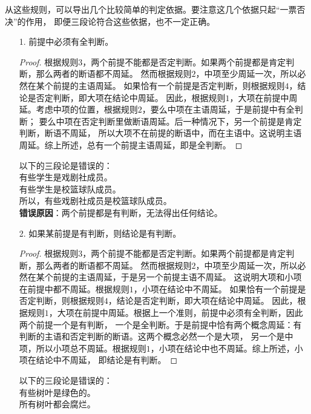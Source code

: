 \documentclass[12pt,UTF8]{ctexbook}
\begin{document}
从这些规则，可以导出几个比较简单的判定依据。要注意这几个依据只起“一票否决”的作用，
即便三段论符合这些依据，也不一定正确。
\begin{enumerate}
    \item[1.] 前提中必须有全判断。
    \begin{proof}
        根据规则$3$，两个前提不能都是否定判断。如果两个前提都是肯定判断，那么两者的断语都不周延。
        然而根据规则$2$，中项至少周延一次，所以必然在某个前提的主语周延。
        如果恰有一个前提是否定判断，则根据规则$4$，结论是否定判断，即大项在结论中周延。
        因此，根据规则$1$，大项在前提中周延。考虑中项的位置，根据规则$2$，要么中项在主语周延，于是前提中有全判断；
        要么中项在否定判断里做断语周延。后一种情况下，另一个前提是肯定判断，断语不周延，
        所以大项不在前提的断语中，而在主语中。这说明主语周延。综上所述，总有一个前提主语周延，即是全判断。
    \end{proof}
    \begin{ex*}
        以下的三段论是错误的： \\
        \indent 有些学生是戏剧社成员。\\
        \indent 有些学生是校篮球队成员。\\
        \indent 所以，有些戏剧社成员是校篮球队成员。\\
        \textbf{错误原因}：两个前提都是有判断，无法得出任何结论。
    \end{ex*}
    \item[2.] 如果某前提是有判断，则结论是有判断。
    \begin{proof}
        根据规则$3$，两个前提不能都是否定判断。如果两个前提都是肯定判断，那么两者的断语都不周延。
        然而根据规则$2$，中项至少周延一次，所以必然在某个前提的主语周延，于是另一个前提主语不周延。
        这说明大项和小项在前提中都不周延。根据规则$1$，小项在结论中不周延。
        如果恰有一个前提是否定判断，则根据规则$4$，结论是否定判断，即大项在结论中周延。
        因此，根据规则$1$，大项在前提中周延。根据上一个准则，前提中必须有全判断，因此两个前提一个是有判断，
        一个是全判断。于是前提中恰有两个概念周延：有判断的主语和否定判断的断语。这两个概念必然一个是大项，
        另一个是中项，所以小项总不周延。根据规则$1$，小项在结论中也不周延。综上所述，小项在结论中不周延，
        即结论是有判断。
    \end{proof}
    \begin{ex*}
        以下的三段论是错误的： \\
        \indent 有些树叶是绿色的。\\
        \indent 所有树叶都会腐烂。\\

\end{ex*}
\end{enumerate}
\end{document}
